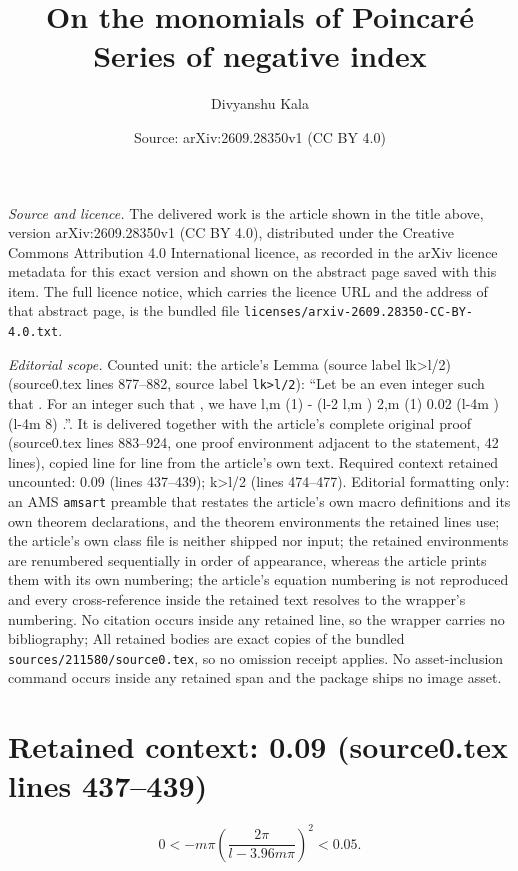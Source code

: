 \documentclass[10pt,a4paper]{amsart}
\title[On the monomials of Poincar\'e Series of negative index]{On the monomials of Poincar\'e Series of negative index}
\author{Divyanshu Kala}
\date{Source: arXiv:2609.28350v1 (CC BY 4.0)}
\theoremstyle{plain}
\begin{document}
\maketitle

\noindent\emph{Source and licence.} The delivered work is the article shown in the title above, version arXiv:2609.28350v1 (CC BY 4.0), distributed under the Creative Commons Attribution 4.0 International licence, as recorded in the arXiv licence metadata for this exact version and shown on the abstract page saved with this item. The full licence notice, which carries the licence URL and the address of that abstract page, is the bundled file \texttt{licenses/arxiv-2609.28350-CC-BY-4.0.txt}.
\par\smallskip

\noindent\textit{Editorial scope.} Counted unit: the article's Lemma (source label lk>l/2) (source0.tex lines 877--882, source label \texttt{lk>l/2}): ``Let be an even integer such that . For an integer such that , we have l,m (1) - (l-2 l,m ) 2,m (1) 0.02 (l-4m )(l-4m 8) .''. It is delivered together with the article's complete original proof (source0.tex lines 883--924, one proof environment adjacent to the statement, 42 lines), copied line for line from the article's own text. Required context retained uncounted: 0.09 (lines 437--439); k>l/2 (lines 474--477). Editorial formatting only: an AMS \texttt{amsart} preamble that restates the article's own macro definitions and its own theorem declarations, and the theorem environments the retained lines use; the article's own class file is neither shipped nor input; the retained environments are renumbered sequentially in order of appearance, whereas the article prints them with its own numbering; the article's equation numbering is not reproduced and every cross-reference inside the retained text resolves to the wrapper's numbering. No citation occurs inside any retained line, so the wrapper carries no bibliography; All retained bodies are exact copies of the bundled \texttt{sources/211580/source0.tex}, so no omission receipt applies. No asset-inclusion command occurs inside any retained span and the package ships no image asset.


\section*{Retained context: 0.09 (source0.tex lines 437--439)}

\begin{equation}\label{0.09}
0<-m\pi\left(\frac{2\pi}{l-3.96m\pi}\right)^2<0.05.
\end{equation}
\end{document}
